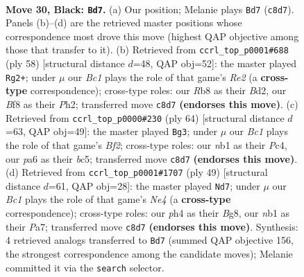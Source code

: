 \documentclass[11pt]{article}
\begin{document}
\clearpage

\begin{figure}[p]\centering
\begin{subfigure}{0.46\textwidth}\centering
\resizebox{\linewidth}{!}{%
\newchessgame
\chessboard[
  setfen={1rb1kb2/p1p2p1r/P1p3p1/2P4p/1P3P1P/8/3B4/RN2K2R b Q - 8 30},
  showmover=false,
  pgfstyle=straightmove, color=movearrow, markmove={c8-d7}
]}
\caption{}
\end{subfigure}\hfill
\begin{subfigure}{0.46\textwidth}\centering
\resizebox{\linewidth}{!}{%
\newchessgame
\chessboard[
  setfen={r5k1/2p1br2/3p4/p1pP3p/P1P2p2/1P6/3BR2P/5RK1 w - - 0 30},
  showmover=false,
  pgfstyle=straightmove, color=movearrow, markmove={e2-g2}
]}
\caption{}
\end{subfigure}
\\[4pt]
\begin{subfigure}{0.46\textwidth}\centering
\resizebox{\linewidth}{!}{%
\newchessgame
\chessboard[
  setfen={1r6/3nr1k1/1p4p1/p1bP1p1p/P1P4P/3B1P2/1R3BK1/3R4 w - - 2 33},
  showmover=false,
  pgfstyle=straightmove, color=movearrow, markmove={f2-g3}
]}
\caption{}
\end{subfigure}\hfill
\begin{subfigure}{0.46\textwidth}\centering
\resizebox{\linewidth}{!}{%
\newchessgame
\chessboard[
  setfen={r3k1br/pp2b1p1/4pp2/1P2n2P/P3P3/5N2/4BP2/R1B2K1R b kq - 1 25},
  showmover=false,
  pgfstyle=straightmove, color=movearrow, markmove={e5-d7}
]}
\caption{}
\end{subfigure}
\caption{\textbf{Move 30, Black: \texttt{Bd7}.} (a) Our position; Melanie plays \texttt{Bd7} (\texttt{c8d7}). Panels (b)--(d) are the retrieved master positions whose correspondence most drove this move (highest QAP objective among those that transfer to it). (b) Retrieved from \texttt{ccrl\_top\_p0001\#688} (ply 58) [structural distance $d$=48, QAP obj=52]: the master played \texttt{Rg2+}; under $\mu$ our \emph{Bc1} plays the role of that game's \emph{Re2} (a \textbf{cross-type} correspondence); cross-type roles: our \emph{R}b8 as their \emph{B}d2, our \emph{B}f8 as their \emph{P}h2; transferred move \texttt{c8d7} \textbf{(endorses this move)}. (c) Retrieved from \texttt{ccrl\_top\_p0000\#230} (ply 64) [structural distance $d$=63, QAP obj=49]: the master played \texttt{Bg3}; under $\mu$ our \emph{Bc1} plays the role of that game's \emph{Bf2}; cross-type roles: our \emph{n}b1 as their \emph{P}c4, our \emph{p}a6 as their \emph{b}c5; transferred move \texttt{c8d7} \textbf{(endorses this move)}. (d) Retrieved from \texttt{ccrl\_top\_p0001\#1707} (ply 49) [structural distance $d$=61, QAP obj=28]: the master played \texttt{Nd7}; under $\mu$ our \emph{Bc1} plays the role of that game's \emph{Ne4} (a \textbf{cross-type} correspondence); cross-type roles: our \emph{p}h4 as their \emph{B}g8, our \emph{n}b1 as their \emph{P}a7; transferred move \texttt{c8d7} \textbf{(endorses this move)}. Synthesis: 4 retrieved analogs transferred to \texttt{Bd7} (summed QAP objective 156, the strongest correspondence among the candidate moves); Melanie committed it via the \texttt{search} selector.}
\label{fig:thought-m59}
\end{figure}
\end{document}
